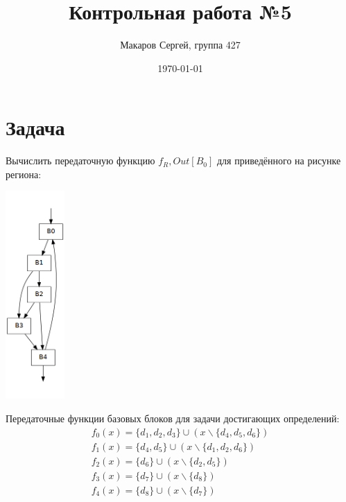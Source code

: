 \documentclass[11pt]{article}
\author{Макаров Сергей, группа 427}
\date{\today}
\title{Контрольная работа №5}
\begin{document}
\maketitle

\section{Задача}
\label{sec:org876dbbb}
Вычислить передаточную функцию \(f_R,Out[B_0]\) для приведённого на рисунке региона:
\begin{center}
\includegraphics[height=300px]{cfg6.png}
\end{center}

Передаточные функции базовых блоков для задачи достигающих определений:
\begin{gather*}
f_0(x) = \{d_1, d_2, d_3\} \cup (x \backslash \{d_4, d_5, d_6\}) \\
f_1(x) = \{d_4, d_5\} \cup (x \backslash \{d_1, d_2, d_6\}) \\
f_2(x) = \{d_6\} \cup (x \backslash \{d_2, d_5\}) \\
f_3(x) = \{d_7\} \cup (x \backslash \{d_8\}) \\
f_4(x) = \{d_8\} \cup (x \backslash \{d_7\})
\end{gather*}
\end{document}
